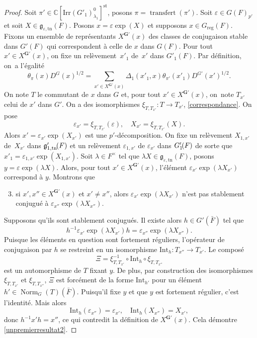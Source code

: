 \documentclass[JEP,XML,SOM,Unicode,francais]{cedram}
\let\epsilon\varepsilon
\newcommand{\frg}{\mathfrak{g}}
\newcommand{\Int}{\mathrm{Int}}
\newcommand{\Irr}{\mathrm{Irr}}
\newcommand{\reg}{\mathrm{reg}}
\newcommand{\st}{\mathrm{st}}
\newcommand{\tn}{\mathrm{tn}}
\DeclareMathOperator{\Norm}{Norm}
\DeclareMathOperator{\transfert}{transfert}
\newcommand{\bG}{\boldsymbol{G}}
\newcommand{\CC}{\mathbb{C}}
\theoremstyle{plain}
\theoremstyle{definition}
\begin{document}
\begin{proof}
Soit $\pi'\in \CC[\Irr(G'_{1})^0_{\lambda_{1}}]^{\st}$, posons $\pi=\transfert(\pi')$. Soit $\epsilon\in G(F)_{p'}$ et soit $X\in \frg_{\epsilon,\tn}(F)$. Posons $x=\epsilon \exp(X)$ et supposons $x\in G_{\reg}(F)$. Fixons un ensemble de représentants $X^{\bG'}(x)$ des classes de conjugaison stable dans $G'(F)$ qui correspondent à celle de $x$ dans $G(F)$. Pour tout $x'\in X^{\bG'}(x)$, on fixe un relèvement~$x'_{1}$ de~$x'$ dans $G'_{1}(F)$. Par définition, on~a l'égalité
\begin{equation}\tag{1}\label{unpremierresultat1}
\theta_{\pi}(x)D^G(x)^{1/2}=\sum_{x'\in X^{\bG'}(x)}\Delta_{1}(x'_{1},x)\theta_{\pi'}(x'_{1})D^{G'}(x')^{1/2}.
\end{equation}
On note $T$ le commutant de $x$ dans $G$ et, pour tout $x'\in X^{\bG'}(x)$, on~note $T_{x'}$ celui de $x'$ dans $G'$. On a des isomorphismes $\xi_{T,T_{x'}}:T\to T_{x'}$, \cf \ref{correspondance}. On pose
\[
\epsilon_{x'}=\xi_{T,T_{x'}}(\epsilon),\quad X_{x'}=\xi_{T,T_{x'}}(X).
\]
Alors $x'\!=\!\epsilon_{x'}\exp(X_{x'})$ est une $p'$-décomposition. On fixe un relèvement $X_{1,x'}$ de~$X_{x'}$ dans $\frg'_{1,\tn}\mkern-2.5mu(F)$ et un relèvement $\epsilon_{1,x'}$ de $\epsilon_{x'}$ dans $G'_{1}\mkern-2.5mu(F)$ de sorte que~\hbox{$x'_{1}\!\!=\!\epsilon_{1,x'}\exp(X_{1,x'})$}.
Soit $\lambda\in F^{\times}$ tel que $\lambda X\in \frg_{\epsilon,\tn}(F)$, posons $y=\epsilon \exp(\lambda X)$. Alors, pour tout $x'\in X^{\bG'}(x)$, l'élément $\epsilon_{x'}\exp(\lambda X_{x'})$ correspond à $ y$. Montrons que
\begin{enumerate}\setcounter{enumi}{2}
\item\label{unpremierresultat2}
si $x',x''\in X^{\bG'}(x)$ et $x'\neq x''$, alors $\epsilon_{x'}\exp(\lambda X_{x'})$ n'est pas stablement conjugué à $\epsilon_{x''}\exp(\lambda X_{x''})$.
\end{enumerate}

Supposons qu'ils sont stablement conjugués. Il existe alors $h\in G'(\bar{F})$ tel que
\[
h^{-1}\epsilon_{x'}\exp(\lambda X_{x'})h=\epsilon_{x''}\exp(\lambda X_{x''}).
\]
Puisque les éléments en question sont fortement réguliers, l'opérateur de conjugaison par $h$ se restreint en un isomorphisme $\Int_{h}:T_{x''}\to T_{x'}$. Le composé
\[
\Xi=\xi_{T,T_{x'}}^{-1}\circ \Int_{h}\circ\xi_{T,T_{x''}}
\]
est un automorphisme de $T$ fixant $y$. De plus, par construction des isomorphismes $\xi_{T,T_{x'}}$ et $\xi_{T,T_{x''}}$, $\Xi$ est forcément de la forme $\Int_{h'}$ pour un élément $h'\in \Norm_{G}(T)(\bar{F})$. Puisqu'il fixe $y$ et que $y$ est fortement régulier, c'est l'identité. Mais alors
\[
\Int_{h}(\epsilon_{x''})=\epsilon_{x'},\quad \Int_{h}(X_{x''})=X_{x'},
\]
donc $h^{-1}x'h=x''$, ce qui contredit la définition de $X^{\bG'}(x)$. Cela démontre \eqref{unpremierresultat2}.


\end{proof}
\end{document}

